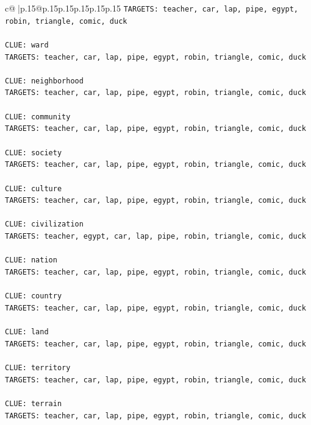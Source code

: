 \documentclass{article}
\begin{document}
{\begin{supertabular}{c@{$\;$}|p{.15\linewidth}@{}p{.15\linewidth}p{.15\linewidth}p{.15\linewidth}p{.15\linewidth}p{.15\linewidth}}
{{{\texttt{TARGETS: teacher, car, lap, pipe, egypt, robin, triangle, comic, duck} \\
\\ 
\texttt{CLUE: ward} \\
\texttt{TARGETS: teacher, car, lap, pipe, egypt, robin, triangle, comic, duck} \\
\\ 
\texttt{CLUE: neighborhood} \\
\texttt{TARGETS: teacher, car, lap, pipe, egypt, robin, triangle, comic, duck} \\
\\ 
\texttt{CLUE: community} \\
\texttt{TARGETS: teacher, car, lap, pipe, egypt, robin, triangle, comic, duck} \\
\\ 
\texttt{CLUE: society} \\
\texttt{TARGETS: teacher, car, lap, pipe, egypt, robin, triangle, comic, duck} \\
\\ 
\texttt{CLUE: culture} \\
\texttt{TARGETS: teacher, car, lap, pipe, egypt, robin, triangle, comic, duck} \\
\\ 
\texttt{CLUE: civilization} \\
\texttt{TARGETS: teacher, egypt, car, lap, pipe, robin, triangle, comic, duck} \\
\\ 
\texttt{CLUE: nation} \\
\texttt{TARGETS: teacher, car, lap, pipe, egypt, robin, triangle, comic, duck} \\
\\ 
\texttt{CLUE: country} \\
\texttt{TARGETS: teacher, car, lap, pipe, egypt, robin, triangle, comic, duck} \\
\\ 
\texttt{CLUE: land} \\
\texttt{TARGETS: teacher, car, lap, pipe, egypt, robin, triangle, comic, duck} \\
\\ 
\texttt{CLUE: territory} \\
\texttt{TARGETS: teacher, car, lap, pipe, egypt, robin, triangle, comic, duck} \\
\\ 
\texttt{CLUE: terrain} \\
\texttt{TARGETS: teacher, car, lap, pipe, egypt, robin, triangle, comic, duck} \\
}}}
\end{supertabular}}
\end{document}
